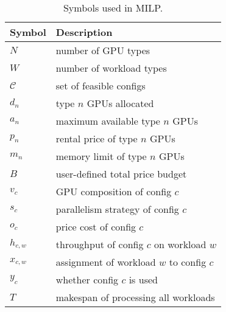 \begin{table}[t]
\caption{\small{Symbols used in MILP.}}
\vspace{-1em}
\label{tab:milp-notation}
\small
\centering
\begin{tabular}{l | p{6cm}}
\toprule
\textbf{Symbol} & \textbf{Description} \\
\midrule
$N$         & number of GPU types \\ 
$W$         & number of workload types \\
$\mathcal{C}$ & set of feasible configs \\
$d_n$       & type $n$ GPUs allocated \\
$a_n$       & maximum available type $n$ GPUs \\
$p_n$       & rental price of type $n$ GPUs \\
$m_n$       & memory limit of type $n$ GPUs \\
$B$         & user-defined total price budget \\
$v_c$ & GPU composition of config $c$ \\
$s_c$ & parallelism strategy of config $c$ \\
$o_c$       & price cost of config $c$ \\
$h_{c,w}$   & throughput of config $c$ on workload $w$ \\
$x_{c,w}$   & assignment of workload $w$ to config $c$ \\
$y_c$   & whether config $c$ is used \\
$T$         & makespan of processing all workloads \\

\bottomrule
\end{tabular}
\vspace{-1em}
\end{table}
